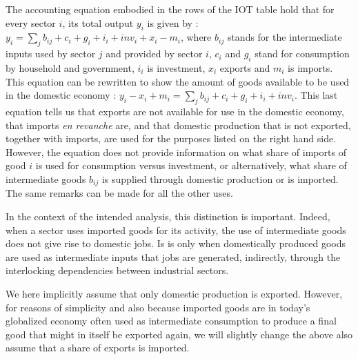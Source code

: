 \documentclass[12pt,english]{article}
\begin{document}
The accounting equation embodied in the rows of the IOT table hold that for every sector $i$, its total output $y_i$ is given by : $y_i = \sum_j b_{ij} + c_i + g_i + i_i + inv_i + x_i - m_i$, where $b_{ij}$ stands for the intermediate inputs used by sector $j$ and provided by sector $i$, $c_i$ and $g_i$ stand for consumption by household and government, $i_i$ is investment, $x_i$ exports and $m_i$ is imports. This equation can be rewritten to show the amount of goods available to be used in the domestic economy :  $y_i - x_i + m_i = \sum_j b_{ij} + c_i + g_i + i_i + inv_i$. This last equation tells us that exports are not available for use in the domestic economy, that imports \emph{en revanche} are, and that domestic production that is not exported, together with imports, are used for the purposes listed on the right hand side. %
However, the equation does not provide information on what share of imports of good $i$ is used for consumption versus investment, or alternatively, what share of intermediate goods $b_{ij}$ is supplied through domestic production or is imported. The same remarks can be made for all the other uses. %

In the context of the intended analysis, this distinction is important. Indeed, when a sector uses imported goods for its activity, the use of intermediate goods does not give rise to domestic jobs. Is is only when domestically produced goods are used as intermediate inputs that jobs are generated, indirectly, through the interlocking dependencies between industrial sectors. %

We here implicitly assume that only domestic production is exported. However, for reasons of simplicity and also because imported goods are in today's globalized economy often used as intermediate consumption to produce a final good that might in itself be exported again, we will slightly change the above also assume that a share of exports is imported. 
\end{document}
